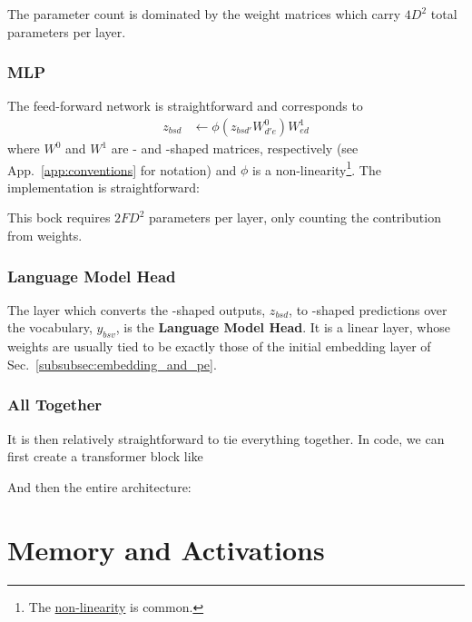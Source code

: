 \documentclass[11pt]{article}
\begin{document}
The parameter count is dominated by the weight matrices which carry $ 4 D ^{ 2 } $ total parameters per layer.


\subsubsection{MLP \label{subsubsec:mlp} }

The feed-forward network is straightforward and corresponds to
\begin{align}
  z _{ bsd } &\leftarrow \phi \left ( z _{ bsd' }W ^{ 0 }_{ d'e } \right ) W ^{ 1 } _{ ed }
\end{align}
where $ W ^{ 0 } $ and $ W ^{ 1 } $ are - and -shaped matrices,
respectively (see App.~\ref{app:conventions} for notation) and $ \phi $ is a
non-linearity\footnote{The 
\href{https://pytorch.org/docs/stable/generated/torch.nn.GELU.html}{non-linearity} is common.}. The
implementation is straightforward: 

This bock requires $ 2 F D ^{ 2 } $ parameters per layer, only counting the contribution from
weights.


\subsubsection{Language Model Head \label{subsubsec:language_model_head} }


The layer which converts the -shaped outputs, $ z _{ bsd } $, to -shaped
predictions over the vocabulary, $  y _{ bsv } $, is the \textbf{Language Model Head}. It
is a linear layer, whose weights are usually tied to be exactly those of the initial embedding
layer of Sec.~\ref{subsubsec:embedding_and_pe}.


\subsubsection{All Together}
It is then relatively straightforward to tie everything together.  In code, we can first create a
transformer block like

And then the entire architecture: 

\section{Memory and Activations }
\end{document}
